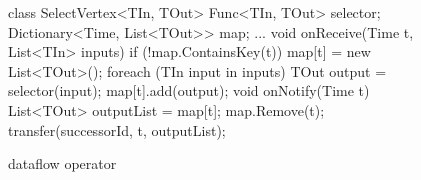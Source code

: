 \begin{figure}[t!]
\begin{numcodejava}
class SelectVertex<TIn, TOut> {
  Func<TIn, TOut> selector;
  Dictionary<Time, List<TOut>> map;
  ...
  void onReceive(Time t, List<TIn> inputs) {
    if (!map.ContainsKey(t))
       map[t] = new List<TOut>();
    foreach (TIn input in inputs) {
      TOut output = selector(input);
      map[t].add(output);
    }
  }
  void onNotify(Time t) {
     List<TOut> outputList = map[t];
     map.Remove(t);
     transfer(successorId, t, outputList); 
  }
}
\end{numcodejava}
\caption{ dataflow operator}
\label{fig:motivating-eg}
\end{figure}
